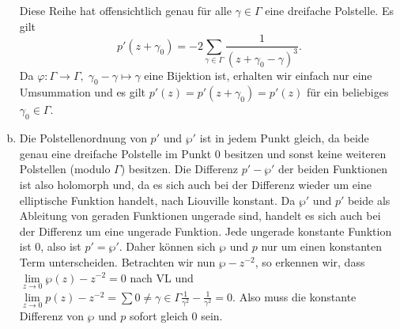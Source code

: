 \documentclass{article}
\begin{document}
\begin{enumerate}[(a)]
\[    \]
    Diese Reihe hat offensichtlich genau für alle $\gamma \in \Gamma$ eine dreifache Polstelle. Es gilt \[p'(z + \gamma_0) = -2 \sum_{\gamma \in \Gamma} \frac{1}{(z + \gamma_0 -\gamma)^3}.\] Da $\varphi\colon \Gamma \to \Gamma,\; \gamma_0 -\gamma \mapsto \gamma$ eine Bijektion ist, erhalten wir einfach nur eine Umsummation und es gilt $p'(z) = p'(z + \gamma_0) = p'(z)$ für ein beliebiges $\gamma_0 \in \Gamma$. 
    \item Die Polstellenordnung von $p'$ und $\wp'$ ist in jedem Punkt gleich, da beide genau eine dreifache Polstelle im Punkt $0$ besitzen und sonst keine weiteren Polstellen (modulo $\Gamma$) besitzen. Die Differenz $p' - \wp'$ der beiden Funktionen ist also holomorph und, da es sich auch bei der Differenz wieder um eine elliptische Funktion handelt, nach Liouville konstant. Da $\wp'$ und $p'$ beide als Ableitung von geraden Funktionen ungerade sind, handelt es sich auch bei der Differenz um eine ungerade Funktion. Jede ungerade konstante Funktion ist 0, also ist $p' = \wp'$. Daher können sich $\wp$ und $p$ nur um einen konstanten Term unterscheiden. Betrachten wir nun $\wp - z^{-2}$, so erkennen wir, dass $\lim\limits_{z \to 0} \wp(z) - z^{-2} = 0$ nach VL und $\lim\limits_{z \to 0} p(z) - z^{-2} = \sum{0\neq \gamma\in \Gamma} \frac{1}{\gamma^2} - \frac{1}{\gamma^2} = 0$. Also muss die konstante Differenz von $\wp$ und $p$ sofort gleich 0 sein.
  \end{enumerate}
\end{document}
